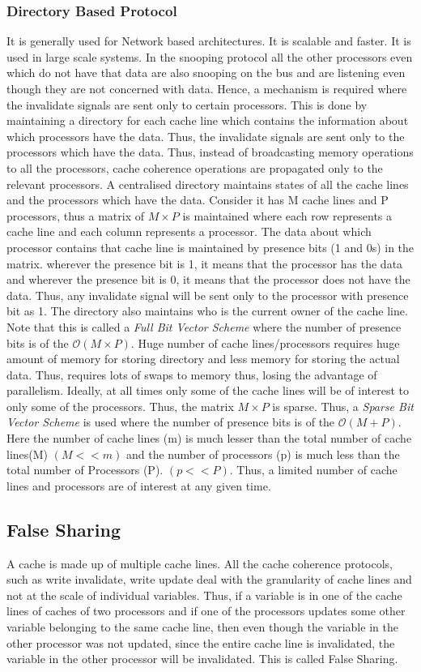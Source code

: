 \documentclass[12pt]{book}
\begin{document}
\subsubsection{Directory Based Protocol}
It is generally used for Network based architectures. It is scalable and faster. It is used in large scale systems.
In the snooping protocol all the other processors even which do not have that data are also snooping on the bus and are listening even though they are not concerned with data.
Hence, a mechanism is required where the invalidate signals are sent only to certain processors. This is done by maintaining a directory for each cache line 
which contains the information about which processors have the data. Thus, the invalidate signals are sent only to the processors which have the data.
Thus, instead of broadcasting memory operations to all the processors, cache coherence operations are propagated only to the relevant processors. 
A centralised directory maintains states of all the cache lines and the processors which have the data.
Consider it has M cache lines and P processors, thus a matrix of $M \times P$ is maintained where each row represents a cache line and each column represents a processor.
The data about which processor contains that cache line is maintained by presence bits (1 and 0s) in the matrix. wherever the presence bit is 1,
it means that the processor has the data and wherever the presence bit is 0, it means that the processor does not have the data.
Thus, any invalidate signal will be sent only to the processor with presence bit as 1. The directory also maintains 
who is the current owner of the cache line. 
Note that this is called a \textit{Full Bit Vector Scheme} where the number of presence bits is of the $\mathcal{O}(M \times P)$.
Huge number of cache lines/processors requires huge amount of memory for storing directory and less memory for storing the actual data. Thus, requires
lots of swaps to memory thus, losing the advantage of parallelism. Ideally, at all times only some of the cache lines will be of interest to only some of the processors. 
Thus, the matrix $M \times P$ is sparse. Thus, a \textit{Sparse Bit Vector Scheme} is used where the number of presence bits is of the $\mathcal{O}(M + P)$.
Here the number of cache lines (m) is much lesser than the total number of cache lines(M) $(M<<m)$ and the number of processors (p) is much less than the
total number of Processors (P). $(p<<P)$. Thus, a limited number of cache lines and processors are of interest at any given time.

\subsection{False Sharing}
A cache is made up of multiple cache lines. All the cache coherence protocols, such as write invalidate, write update deal with the granularity of cache lines and not at the scale of individual variables.
Thus, if a variable is in one of the cache lines of caches of two processors and if one of the processors updates some other variable belonging to the same cache line, then even though 
the variable in the other processor was not updated, since the entire cache line is invalidated, the variable in the other processor will be invalidated. This is called False Sharing.
\end{document}
